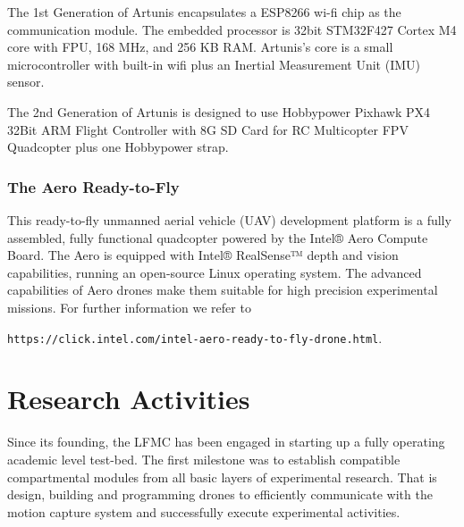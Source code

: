 \documentclass[english,letter,12pt,onesided]{article}
\theoremstyle{definition}
\begin{document}
The 1st Generation of Artunis encapsulates a ESP8266 wi-fi chip as the communication module. The embedded processor is 32bit STM32F427 Cortex M4 core with FPU, 168 MHz, and 256 KB RAM. Artunis's core is a small microcontroller with built-in wifi plus an Inertial Measurement Unit (IMU) sensor.

The 2nd Generation of Artunis is designed to use Hobbypower Pixhawk PX4 32Bit ARM Flight Controller with 8G SD Card for RC Multicopter FPV Quadcopter plus one Hobbypower strap.



\subsubsection*{The Aero Ready-to-Fly} This ready-to-fly unmanned aerial vehicle (UAV) development platform is a fully assembled, fully functional quadcopter powered by the Intel® Aero Compute Board. The Aero is equipped with Intel® RealSense™ depth and vision capabilities, running an open-source Linux operating system.  The advanced capabilities of Aero drones make them suitable for high precision experimental missions. For further information we refer to

 \texttt{https://click.intel.com/intel-aero-ready-to-fly-drone.html}.

\section*{Research Activities} Since its founding, the LFMC has been engaged in starting up a fully operating academic level test-bed. The first milestone was to establish compatible compartmental modules from all basic layers of experimental research. That is design, building and programming drones to efficiently communicate with the motion capture system and successfully execute experimental activities. %
\end{document}

